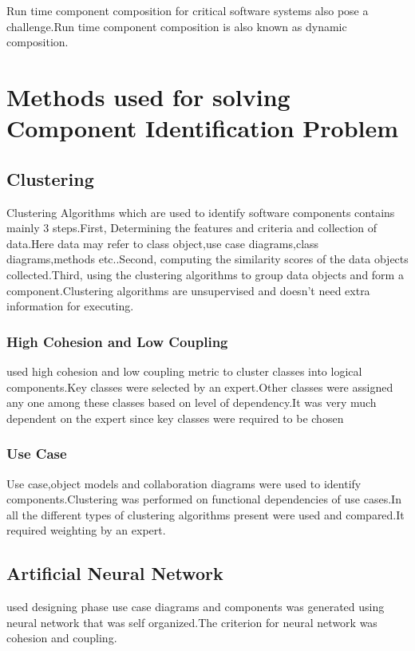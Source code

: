 \documentclass[12pt]{article}
\begin{document}
Run time component composition for critical software systems also pose a challenge.Run time component composition is also known as dynamic composition\cite{dyanamicComp}.


\section{Methods used for solving Component Identification Problem}


\subsection{Clustering}
Clustering Algorithms which are used to identify software components contains mainly 3 steps.First, Determining the features and criteria and collection of data.Here data may refer to class object,use case diagrams,class diagrams,methods etc..Second, computing the similarity scores of the data objects collected.Third, using the clustering algorithms to group data objects and form a component.Clustering algorithms are unsupervised and doesn't need extra information for executing\cite{clusteringAna}.
\subsubsection{High Cohesion and Low Coupling}
\cite{highCohesionLowCoupling} used high cohesion and low coupling metric to cluster classes into logical components.Key classes were selected by an expert.Other classes were assigned any one among these classes based on level of dependency.It was very much dependent on the expert since key classes were required to be chosen
\subsubsection{Use Case}
Use case,object models and collaboration diagrams were used to identify components.Clustering was performed on functional dependencies of use cases.In \cite{KMeans}\cite{agglomerative} all the different types of clustering algorithms present were used and compared.It required weighting by an expert.

\subsection{Artificial Neural Network}
\cite{neural} used designing phase use case diagrams and components was generated using neural network that was self organized.The criterion for neural network was cohesion and coupling.
\end{document}
